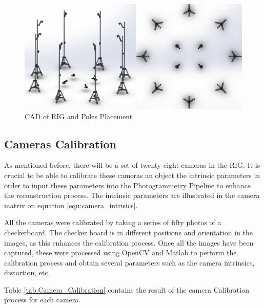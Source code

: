 \documentclass[12pt]{report}
\begin{document}
\begin{figure}[H]%
  \centering
  \includegraphics[width=1\textwidth]{cad.png}
 \caption{CAD of RIG and Poles Placement}
 \label{fig:cad} 
\end{figure}


\subsection{Cameras Calibration}
As mentioned before, there will be a set of twenty-eight cameras in the RIG. 
It is crucial to be able to calibrate these cameras an object the intrinsic parameters in order to input these parameters into the Photogrammetry Pipeline to enhance
the reconstruction process. The intrinsic parameters are illustrated in the camera matrix on equation \ref{equ:camera_intrisics}.

All the cameras were calibrated by taking a series of fifty photos of a checkerboard. The checker board is in different positions and orientation in the images, as this enhances the calibration process.
Once all the images have been captured, these were processed using OpenCV and Matlab to perform the calibration process and obtain several parameters such as the camera intrinsics, distortion, etc.

Table \ref{tab:Camera_Calibration} contains the result of the camera Calibration process for each camera.
\end{document}
